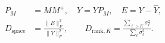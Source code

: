 \documentclass{article}
\begin{document}
\fontsize{22}{29}\selectfont
\[
\begin{aligned}P_M&=MM^+,\quad \widehat Y=YP_M,\quad E=Y-\widehat Y,\\D_{\mathrm{space}}&=\frac{\|E\|_F^2}{\|Y\|_F^2},\qquad D_{\mathrm{rank},K}=\frac{\sum_{\ell>K}\sigma_\ell^2}{\sum_\ell\sigma_\ell^2}.\end{aligned}
\]
\end{document}
